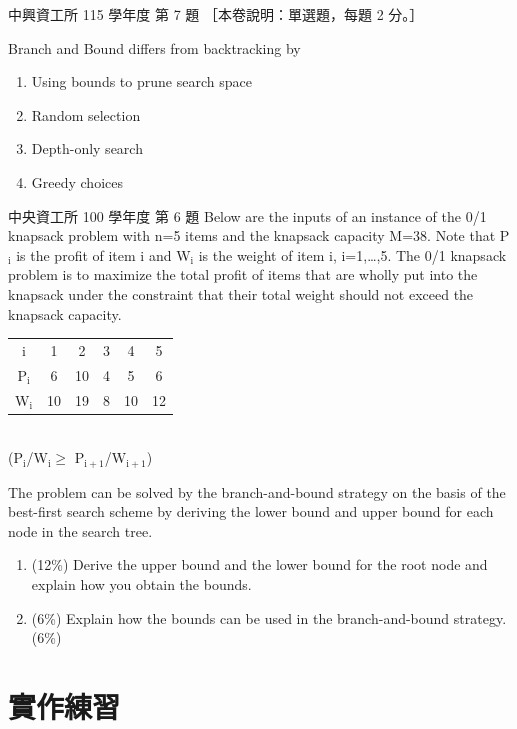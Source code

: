 \begin{pastexam}[label={px:bk-4}]{中興資工所 115 學年度 第 7 題}
［本卷說明：單選題，每題 2 分。］

Branch and Bound differs from backtracking by
\begin{enumerate}[label=\Alph*.,nosep]
\item Using bounds to prune search space
\item Random selection
\item Depth-only search
\item Greedy choices
\end{enumerate}
\end{pastexam}

\begin{pastexam}[label={px:bk-5}]{中央資工所 100 學年度 第 6 題}
Below are the inputs of an instance of the 0/1 knapsack problem with n=5 items and the knapsack capacity M=38. Note that P$_\mathrm{i}$ is the profit of item i and W$_\mathrm{i}$ is the weight of item i, i=1,\ldots,5. The 0/1 knapsack problem is to maximize the total profit of items that are wholly put into the knapsack under the constraint that their total weight should not exceed the knapsack capacity.
\begin{center}
\begin{tabular}{cccccc}
i & 1 & 2 & 3 & 4 & 5 \\
P$_\mathrm{i}$ & 6 & 10 & 4 & 5 & 6 \\
W$_\mathrm{i}$ & 10 & 19 & 8 & 10 & 12 \\
\end{tabular}\\[2pt]
(P$_\mathrm{i}$/W$_\mathrm{i}\ge$ P$_\mathrm{i+1}$/W$_\mathrm{i+1}$)
\end{center}
The problem can be solved by the branch-and-bound strategy on the basis of the best-first search scheme by deriving the lower bound and upper bound for each node in the search tree.
\begin{enumerate}[itemsep=2pt,topsep=2pt]
\item[6.1] (12\%) Derive the upper bound and the lower bound for the root node and explain how you obtain the bounds.
\item[6.2] (6\%) Explain how the bounds can be used in the branch-and-bound strategy. (6\%)
\end{enumerate}
\end{pastexam}

\section{實作練習}
\label{sec:bk-practice}

